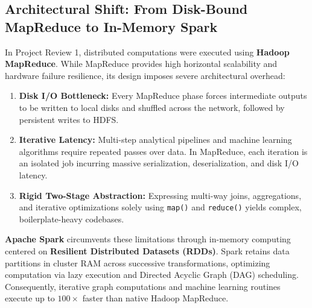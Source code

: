 \documentclass[11pt,a4paper]{article}
\begin{document}
\subsection{Architectural Shift: From Disk-Bound MapReduce to In-Memory Spark}
In Project Review 1, distributed computations were executed using \textbf{Hadoop MapReduce}. While MapReduce provides high horizontal scalability and hardware failure resilience, its design imposes severe architectural overhead:
\begin{enumerate}
    \item \textbf{Disk I/O Bottleneck:} Every MapReduce phase forces intermediate outputs to be written to local disks and shuffled across the network, followed by persistent writes to HDFS.
    \item \textbf{Iterative Latency:} Multi-step analytical pipelines and machine learning algorithms require repeated passes over data. In MapReduce, each iteration is an isolated job incurring massive serialization, deserialization, and disk I/O latency.
    \item \textbf{Rigid Two-Stage Abstraction:} Expressing multi-way joins, aggregations, and iterative optimizations solely using \texttt{map()} and \texttt{reduce()} yields complex, boilerplate-heavy codebases.
\end{enumerate}

\textbf{Apache Spark} circumvents these limitations through in-memory computing centered on \textbf{Resilient Distributed Datasets (RDDs)}. Spark retains data partitions in cluster RAM across successive transformations, optimizing computation via lazy execution and Directed Acyclic Graph (DAG) scheduling. Consequently, iterative graph computations and machine learning routines execute up to $100\times$ faster than native Hadoop MapReduce.
\end{document}
